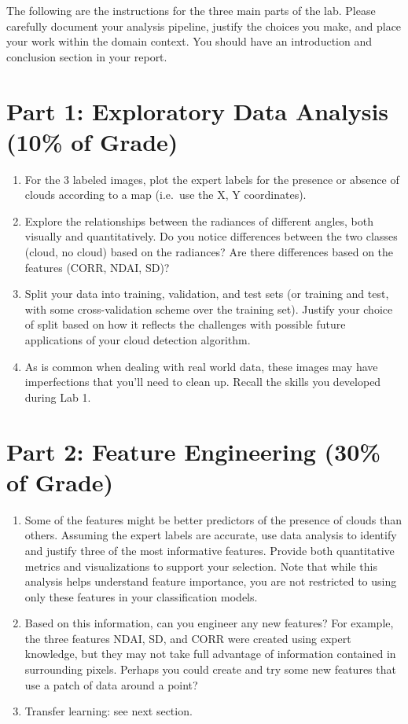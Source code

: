 \documentclass[letterpaper,12pt]{article}
\begin{document}
The following are the instructions for the three main parts of the lab. Please carefully document your analysis pipeline, justify the choices you make, and place your work within the domain context. You should have an introduction and conclusion section in your report.

\section*{Part 1: Exploratory Data Analysis (10\% of Grade)}
\begin{enumerate}
    \item For the 3 labeled images, plot the expert labels for the presence or absence of clouds according to a map (i.e.~use the X, Y coordinates).
    \item Explore the relationships between the radiances of different angles, both visually and quantitatively. Do you notice differences between the two classes (cloud, no cloud) based on the radiances? Are there differences based on the features (CORR, NDAI, SD)?
    \item Split your data into training, validation, and test sets (or training and test, with some cross-validation scheme over the training set). Justify your choice of split based on how it reflects the challenges with possible future applications of your cloud detection algorithm.
    \item As is common when dealing with real world data, these images may have imperfections that you'll need to clean up. Recall the skills you developed during Lab 1.
\end{enumerate}

\section*{Part 2: Feature Engineering (30\% of Grade)}
\begin{enumerate}
    \item Some of the features might be better predictors of the presence of clouds than others. Assuming the expert labels are accurate, use data analysis to identify and justify three of the most informative features. Provide both quantitative metrics and visualizations to support your selection. Note that while this analysis helps understand feature importance, you are not restricted to using only these features in your classification models.
    \item Based on this information, can you engineer any new features? For example, the three features NDAI, SD, and CORR were created using expert knowledge, but they may not take full advantage of information contained in surrounding pixels. Perhaps you could create and try some new features that use a patch of data around a point?
    \item Transfer learning: see next section.
\end{enumerate}
\end{document}
